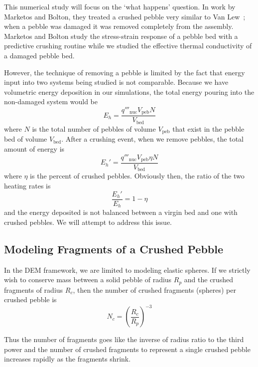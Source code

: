 This numerical study will focus on the `what happens' question. In work by Marketos and Bolton, they treated a crushed pebble very similar to Van Lew\etal~; when a pebble was damaged it was removed completely from the assembly.\cite{Marketos2007,VanLew2014} Marketos and Bolton study the stress-strain response of a pebble bed with a predictive crushing routine while we studied the effective thermal conductivity of a damaged pebble bed.

However, the technique of removing a pebble is limited by the fact that energy input into two systems being studied is not comparable. Because we have volumetric energy deposition in our simulations, the total energy pouring into the non-damaged system would be
\begin{equation}
	E_h = \frac{q'''_\text{nuc} V_\text{peb} N}{V_\text{bed}}
\end{equation}
where $N$ is the total number of pebbles of volume $V_\text{peb}$ that exist in the pebble bed of volume $V_\text{bed}$. After a crushing event, when we remove pebbles, the total amount of energy is
\begin{equation}
	E_h' = \frac{q'''_\text{nuc} V_\text{peb} \eta N}{V_\text{bed}}
\end{equation}
where $\eta$ is the percent of crushed pebbles. Obviously then, the ratio of the two heating rates is\begin{equation}
	\frac{E_h'}{E_h} = 1 - \eta
\end{equation}
and the energy deposited is not balanced between a virgin bed and one with crushed pebbles. We will attempt to address this issue.

\subsection{Modeling Fragments of a Crushed Pebble}
In the DEM framework, we are limited to modeling elastic spheres. If we strictly wish to conserve mass between a solid pebble of radius $R_p$ and the crushed fragments of radius $R_c$, then the number of crushed fragments (spheres) per crushed pebble is
\begin{equation}\label{eq:nc-crushed-fragments}
	N_c = \left(\frac{R_c}{R_p}\right)^{-3}
\end{equation}

Thus the number of fragments goes like the inverse of radius ratio to the third power and the number of crushed fragments to represent a single crushed pebble increases rapidly as the fragments shrink.


